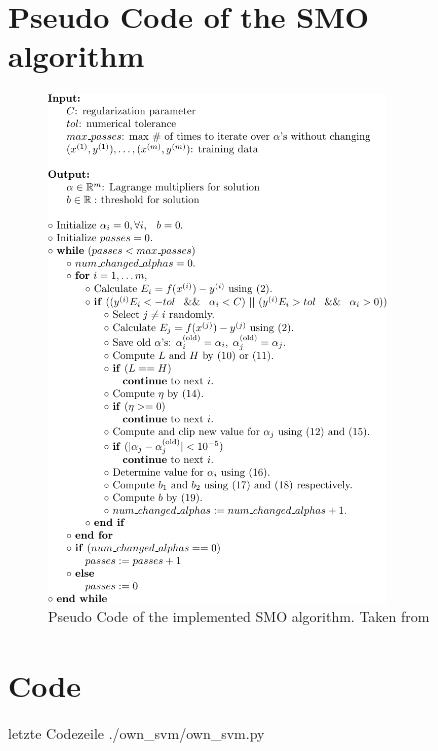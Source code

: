 \section{Pseudo Code of the SMO algorithm}
\begin{figure}[!h]
  \centering
    \includegraphics[width=0.8\textwidth]{media_saved/pseudo_code}
  \caption{Pseudo Code of the implemented SMO algorithm. Taken from\cite{smo}}  
  \label{fig:pseudo}  
\end{figure}

\iffalse
\section{Code}
 letzte Codezeile
{./own_svm/own_svm.py}

